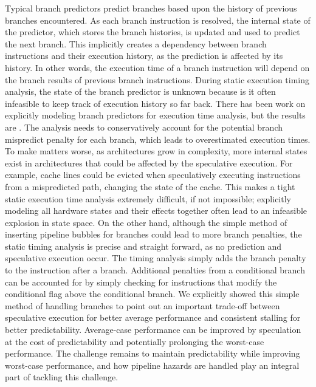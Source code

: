 Typical branch predictors predict branches based upon the history of previous branches encountered.  
As each branch instruction is resolved, the internal state of the predictor, which stores the branch histories, is updated and used to predict the next branch.
This implicitly creates a dependency between branch instructions and their execution history, as the prediction is affected by its history.
In other words, the execution time of a branch instruction will depend on the branch results of previous branch instructions.
During static execution timing analysis, the state of the branch predictor is unknown because is it often infeasible to keep track of execution history so far back.   
There has been work on explicitly modeling branch predictors for execution time analysis, but the results are .
The analysis needs to conservatively account for the potential branch mispredict penalty for each branch, which leads to overestimated execution times.
To make matters worse, as architectures grow in complexity, more internal states exist in architectures that could be affected by the speculative execution. 
For example, cache lines could be evicted when speculatively executing instructions from a mispredicted path, changing the state of the cache.  
This makes a tight static execution time analysis extremely difficult, if not impossible; explicitly modeling all hardware states and their effects together often lead to an infeasible explosion in state space. 
On the other hand, although the simple method of inserting pipeline bubbles for branches could lead to more branch penalties, the static timing analysis is precise and straight forward, as no prediction and speculative execution occur. 
The timing analysis simply adds the branch penalty to the instruction after a branch. 
Additional penalties from a conditional branch can be accounted for by simply checking for instructions that modify the conditional flag above the conditional branch.
We explicitly showed this simple method of handling branches to point out an important trade-off between speculative execution for better average performance and consistent stalling for better predictability.
Average-case performance can be improved by speculation at the cost of predictability and potentially prolonging the worst-case performance.  
The challenge remains to maintain predictability while improving worst-case performance, and how pipeline hazards are handled play an integral part of tackling this challenge.           

